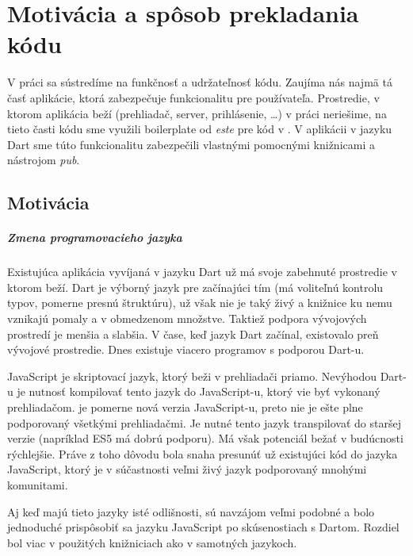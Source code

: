 \chapter{Motivácia a spôsob prekladania kódu}%
\NEW{}
V práci sa sústredíme na funkčnosť a udržateľnosť kódu. Zaujíma nás najmä tá časť aplikácie, ktorá zabezpečuje funkcionalitu pre používateľa. Prostredie, v ktorom aplikácia beží (prehliadač, server, prihlásenie, \ldots) v práci neriešime, na tieto časti kódu sme využili boilerplate %
od \emph{este} \cite{Este} pre kód v \JS{}. 
V aplikácii v jazyku Dart sme túto funkcionalitu zabezpečili vlastnými pomocnými knižnicami a nástrojom \emph{pub}.

\section{Motivácia}
\NEW{}
\paragraph{Zmena programovacieho jazyka}
Existujúca aplikácia vyvíjaná v jazyku Dart už má svoje zabehnuté prostredie v ktorom beží. Dart je výborný jazyk pre začínajúci tím (má voliteľnú kontrolu typov, pomerne presnú štruktúru), už však nie je taký živý a knižnice ku nemu vznikajú pomaly a v obmedzenom množstve. 
Taktiež podpora vývojových prostredí je menšia a slabšia. V čase, keď jazyk Dart začínal, existovalo preň vývojové prostredie. Dnes existuje viacero programov s podporou Dart-u. 

JavaScript je skriptovací jazyk, ktorý beži v prehliadači priamo. Nevýhodou Dart-u je nutnosť kompilovať tento jazyk do JavaScript-u, ktorý vie byť vykonaný prehliadačom. \JS{} je pomerne nová verzia JavaScript-u, preto nie je ešte plne podporovaný všetkými prehliadačmi. Je nutné tento jazyk transpilovať do staršej verzie (napríklad ES5 má dobrú podporu). Má však potenciál bežať v budúcnosti rýchlejšie.
Práve z toho dôvodu bola snaha presunúť už existujúci kód do jazyka JavaScript, ktorý je v súčastnosti veľmi živý jazyk podporovaný mnohými komunitami. 

Aj keď majú tieto jazyky isté odlišnosti, sú navzájom veľmi podobné a bolo jednoduché prispôsobiť sa jazyku JavaScript po skúsenostiach s Dartom.
Rozdiel bol viac v použitých knižniciach ako v samotných jazykoch.


